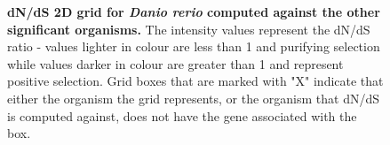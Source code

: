 \documentclass{article}
\begin{document}
\begin{figure}[H]
\centering
{}
\caption{\textbf{dN/dS 2D grid for \textit{Danio rerio} computed against the other significant organisms.} The intensity values represent the dN/dS ratio - values lighter in colour are less than 1 and purifying selection while values darker in colour are greater than 1 and represent positive selection. Grid boxes that are marked with "X" indicate that either the organism the grid represents, or the organism that dN/dS is computed against, does not have the gene associated with the box.}
\label{sup_fig_23}
\end{figure}
\end{document}
